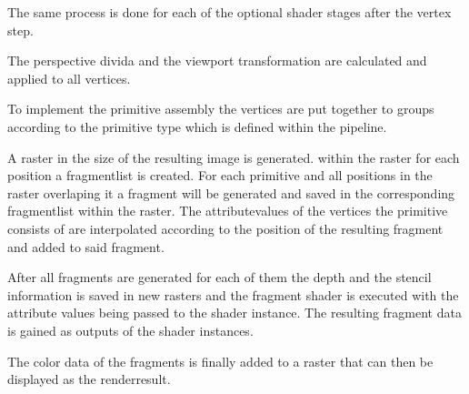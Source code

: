 The same process is done for each of the optional shader stages after the vertex step.

The perspective divida and the viewport transformation are calculated and applied to all vertices.

To implement the primitive assembly the vertices are put together to groups according to the primitive type which is defined within the pipeline.

A raster in the size of the resulting image is generated. within the raster for each position a fragmentlist is created. For each primitive and all positions in the raster overlaping it a fragment will be generated and saved in the corresponding fragmentlist within the raster. The attributevalues of the vertices the primitive consists of are interpolated according to the position of the resulting fragment and added to said fragment.

After all fragments are generated for each of them the depth and the stencil information is saved in new rasters and the fragment shader is executed with the attribute values being passed to the shader instance. The resulting fragment data is gained as outputs of the shader instances.

The color data of the fragments is finally added to a raster that can then be displayed as the renderresult.




